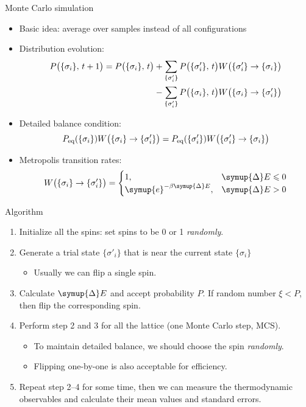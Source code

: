 \documentclass[aspectratio=169]{beamer}
\def\ee{{\symup{e}}}
\def\incr{{\symup{\Delta}}}
\def\q#1{{\{#1\}}}
\begin{document}
\begin{frame}{Monte Carlo simulation}
\small
\begin{itemize}
  \item Basic idea: average over samples instead of all configurations
  \item Distribution evolution:
    \begin{align*}
      P\qty\big(\q{\sigma_i},\,t+1) = P\qty\big(\q{\sigma_i},\,t)
      &+ \sum_{\q{\sigma'_i}} P\qty\big(\q{\sigma'_i},\,t) W\qty\big(\q{\sigma'_i}\to\q{\sigma_i})
         \notag \\
      &- \sum_{\q{\sigma'_i}} P\qty\big(\q{\sigma_i},\,t)  W\qty\big(\q{\sigma_i}\to\q{\sigma'_i})
    \end{align*}
  \item Detailed balance condition:
    \[
        P_{\text{eq}}(\q{\sigma_i})  W\qty\big(\q{\sigma_i}\to\q{\sigma'_i})
      = P_{\text{eq}}(\q{\sigma'_i}) W\qty\big(\q{\sigma'_i}\to\q{\sigma_i})
    \]
  \item Metropolis transition rates:
    \[
      W\qty\big(\q{\sigma_i}\to\q{\sigma'_i}) =
      \begin{cases}
        1, & \incr{E} \leqslant 0 \\
        \ee^{-\beta \incr{E}}, & \incr{E} > 0
      \end{cases}
    \]
\end{itemize}
\end{frame}

\begin{frame}{Algorithm}
\begin{enumerate}
  \item Initialize all the spins: set spins to be 0 or 1 \emph{randomly}.
  \item Generate a trial state $\q{\sigma'_i}$ that is near the current state $\q{\sigma_i}$
    \begin{itemize}
      \item Usually we can flip a single spin.
    \end{itemize}
  \item Calculate $\incr{E}$ and accept probability $P$. If random number $\xi<P$, then flip the
    corresponding spin.
  \item Perform step 2 and 3 for all the lattice (one Monte Carlo step, MCS).
    \begin{itemize}
      \item To maintain detailed balance, we should choose the spin \emph{randomly}.
      \item Flipping one-by-one is also acceptable for efficiency.
    \end{itemize}
  \item Repeat step 2--4 for some time, then we can measure the thermodynamic observables and
    calculate their mean values and standard errors.
\end{enumerate}
\end{frame}
\end{document}
